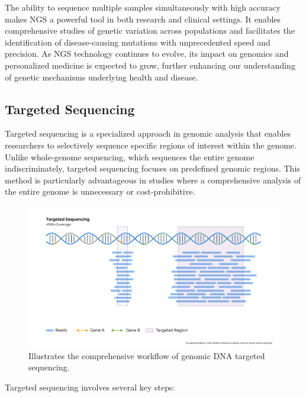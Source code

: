 \documentclass[a4paper,12pt,twoside]{ThesisStyle}
\begin{document}
The ability to sequence multiple samples simultaneously with high accuracy makes NGS a powerful tool in both research and clinical settings. It enables comprehensive studies of genetic variation across populations and facilitates the identification of disease-causing mutations with unprecedented speed and precision. As NGS technology continues to evolve, its impact on genomics and personalized medicine is expected to grow, further enhancing our understanding of genetic mechanisms underlying health and disease.

\subsection{Targeted Sequencing}

Targeted sequencing is a specialized approach in genomic analysis that enables researchers to selectively sequence specific regions of interest within the genome. Unlike whole-genome sequencing, which sequences the entire genome indiscriminately, targeted sequencing focuses on predefined genomic regions. This method is particularly advantageous in studies where a comprehensive analysis of the entire genome is unnecessary or cost-prohibitive.
\begin{figure}[htb]
\includegraphics[width=15 cm]{imatges/targeted_sequencing.jpg}
\caption{\label{fig:logo} Illustrates the comprehensive workflow of genomic DNA targeted sequencing.}
\end{figure}
Targeted sequencing involves several key steps:
\end{document}
